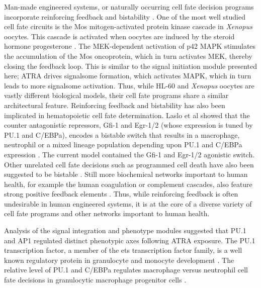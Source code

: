 \documentclass[12pt]{article}
\begin{document}
Man-made engineered systems, or naturally occurring cell fate decision programs incorporate reinforcing feedback and bistability \cite{Ferrell:2002aa,Laslo2006}.
One of the most well studied cell fate circuits is the Mos mitogen-activated protein kinase cascade in \textit{Xenopus} oocytes.
This cascade is activated when oocytes are induced by the steroid hormone progesterone \cite{Xiong:2003aa}.
The MEK-dependent activation of p42 MAPK stimulates the accumulation of the Mos oncoprotein, which in turn activates MEK, thereby closing the feedback loop.
This is similar to the signal initiation module presented here; ATRA drives signalsome formation, which activates MAPK, which in turn leads to more signalsome activation.
Thus, while HL-60 and \textit{Xenopus} oocytes are vastly different biological models, their cell fate programs share a similar architectural feature.
Reinforcing feedback and bistability has also been implicated in hematopoietic cell fate determination.
Laslo et al showed that the counter antagonistic repressors, Gfi-1 and Egr-1/2 (whose expression is tuned by PU.1 and C/EBPa), encodes a bistable switch that
results in a macrophage, neutrophil or a mixed lineage population depending upon PU.1 and C/EBPa expression \cite{Laslo2006}.
The current model contained the Gfi-1 and Egr-1/2 agonistic switch.
Other unrelated cell fate decisions such as programmed cell death have also been suggested to be bistable \cite{Bagci:2006aa}.
Still more biochemical networks important to human health, for example the human coagulation or complement cascades, also feature strong positive feedback elements \cite{Luan:2007aa}.
Thus, while reinforcing feedback is often undesirable in human engineered systems, it is at the core of a diverse variety of
cell fate programs and other networks important to human health.

Analysis of the signal integration and phenotype modules suggested that PU.1 and AP1 regulated distinct phenotypic axes following ATRA exposure.
The PU.1 transcription factor, a member of the ets transcription factor family, is a well known regulatory protein in granulocyte and monocyte development \cite{Friedman2007}.
The relative level of PU.1 and C/EBPa regulates macrophage versus neutrophil cell fate decisions in granulocytic macrophage progenitor cells \cite{Dahl2003}.
\end{document}
